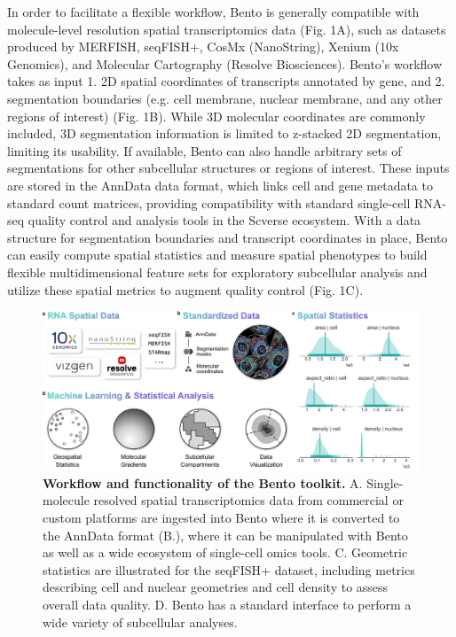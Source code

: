 In order to facilitate a flexible workflow, Bento is generally compatible with molecule-level resolution spatial transcriptomics data (Fig. 1A), such as datasets produced by MERFISH\cite{chenSpatiallyResolvedHighly2015}, seqFISH+\cite{engTranscriptomescaleSuperresolvedImaging2019}, CosMx (NanoString)\cite{heHighplexMultiomicAnalysis2021}, Xenium (10x Genomics)\cite{janesickHighResolutionMapping2022,leeFluorescentSituSequencing2015}, and Molecular Cartography (Resolve Biosciences)\cite{huDynamicControlMetabolic}. Bento's workflow takes as input 1. 2D spatial coordinates of transcripts annotated by gene, and 2. segmentation boundaries (e.g. cell membrane, nuclear membrane, and any other regions of interest) (Fig. 1B). While 3D molecular coordinates are commonly included, 3D segmentation information is limited to z-stacked 2D segmentation, limiting its usability. If available, Bento can also handle arbitrary sets of segmentations for other subcellular structures or regions of interest. These inputs are stored in the AnnData data format\cite{virshupAnndataAnnotatedData2021}, which links cell and gene metadata to standard count matrices, providing compatibility with standard single-cell RNA-seq quality control and analysis tools in the Scverse ecosystem\cite{wolfSCANPYLargescaleSinglecell2018}. With a data structure for segmentation boundaries and transcript coordinates in place, Bento can easily compute spatial statistics and measure spatial phenotypes to build flexible multidimensional feature sets for exploratory subcellular analysis and utilize these spatial metrics to augment quality control (Fig. 1C).

\begin{figure}[h]
    \centering
    \includegraphics[width=\textwidth]{1_figures-and-files/Fig1.pdf}
    \caption[Workflow and functionality of the Bento toolkit.]{\textbf{Workflow and functionality of the Bento toolkit.} A. Single-molecule resolved spatial transcriptomics data from commercial or custom platforms are ingested into Bento where it is converted to the AnnData format (B.), where it can be manipulated with Bento as well as a wide ecosystem of single-cell omics tools. C. Geometric statistics are illustrated for the seqFISH+ dataset, including metrics describing cell and nuclear geometries and cell density to assess overall data quality. D. Bento has a standard interface to perform a wide variety of subcellular analyses.}
    \label{fig:1 bento overview}
\end{figure}

